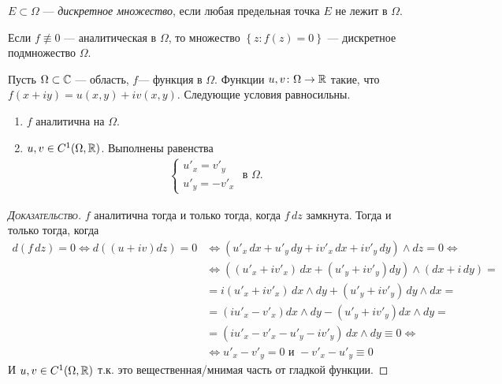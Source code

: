 \begin{df}
 $ E \subset \Omega $ --- \textit{дискретное множество}, если любая предельная точка $ E $ не лежит в $ \Omega $.
\end{df}
\begin{crly}
 Если $ f \not\equiv 0 $ --- аналитическая в $ \Omega $, то множество $ \left\{ z \colon f(z) = 0 \right\} $ --- дискретное подмножество $ \Omega $.
\end{crly}

\begin{thm}
 Пусть $ \Omega \subset \mathbb{C} $ --- область, $ f $--- функция в $ \Omega $. Функции $ u, v \colon \Omega \to \mathbb{R} $ такие, что $ f(x + iy) = u(x, y) + iv(x,y) $. Следующие условия равносильны.
 \begin{enumerate}
  \item $ f $ аналитична на $ \Omega $.
  \item $ u,v \in C^{1}(\Omega, \mathbb{R}) $. Выполнены равенства
   \begin{align*}
    \begin{cases}
     u'_x = v'_y \\
     u'_y = -v'_x
 \end{cases} \text{ в } \Omega.
   \end{align*}
 \end{enumerate}
\end{thm}
\begin{proof}[\normalfont\textsc{Доказательство}]
 $ f $ аналитична тогда и только тогда, когда $ f \, dz $ замкнута. Тогда и только тогда, когда 
\begin{align*}
d(f\,dz) = 0 \iff d((u+iv)dz) = 0 &\iff (u'_x\,dx+u'_y\,dy+iv'_x\,dx+iv'_y\,dy) \land dz = 0 \iff \\
&\iff ((u'_x + iv'_x)\,dx + (u'_y + iv'_y)dy) \land (dx + i\,dy) = \\
& = i(u'_x + iv'_x)\,dx \land dy +  (u'_y + iv'_y)\,dy\land dx = \\
& = (i u'_x - v'_x) dx \land dy - (u'_y + iv'_y) dx \land dy = \\
& = (iu'_x - v'_x - u'_y - iv'_y)\,dx \land dy \equiv 0 \iff \\
& \iff u'_x - v'_y = 0 \text{ и } -v'_x - u'_y \equiv 0
\end{align*} 
И $u, v \in C^1(\Omega, \mathbb{R})$ т.к. это вещественная/мнимая часть от гладкой функции. 
\end{proof}

